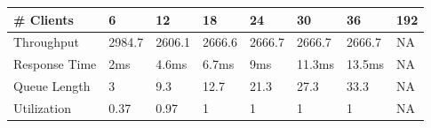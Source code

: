\begin{tabular}{llllllll}
\hline
\# Clients & 6 & 12 & 18 & 24 & 30 & 36 & 192\\
\hline
Throughput & 2984.7 & 2606.1 & 2666.6 & 2666.7 & 2666.7 & 2666.7 & NA\\
Response Time & 2ms & 4.6ms & 6.7ms & 9ms & 11.3ms & 13.5ms & NA\\
Queue Length & 3 & 9.3 & 12.7 & 21.3 & 27.3 & 33.3 & NA\\
Utilization & 0.37 & 0.97 & 1 & 1 & 1 & 1 & NA\\
\hline
\end{tabular}
